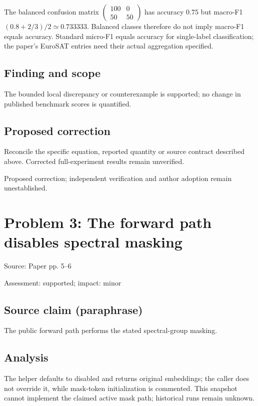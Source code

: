 \documentclass[11pt]{article}
\begin{document}
The balanced confusion matrix \(\begin{pmatrix}100&0\\50&50\end{pmatrix}\) has accuracy \(0.75\) but macro-F1 \((0.8+2/3)/2\simeq0.733333\). Balanced classes therefore do not imply macro-F1 equals accuracy. Standard micro-F1 equals accuracy for single-label classification; the paper's EuroSAT entries need their actual aggregation specified.

\subsection*{Finding and scope}

The bounded local discrepancy or counterexample is supported; no change in published benchmark scores is quantified.

\subsection*{Proposed correction}

Reconcile the specific equation, reported quantity or source contract described above. Corrected full-experiment results remain unverified.

Proposed correction; independent verification and author adoption remain unestablished.

\section*{Problem 3: The forward path disables spectral masking}

Source: Paper pp. 5–6

Assessment: supported; impact: minor

\subsection*{Source claim (paraphrase)}

The public forward path performs the stated spectral-group masking.

\subsection*{Analysis}

The helper defaults to disabled and returns original embeddings; the caller does not override it, while mask-token initialization is commented. This snapshot cannot implement the claimed active mask path; historical runs remain unknown.
\end{document}
